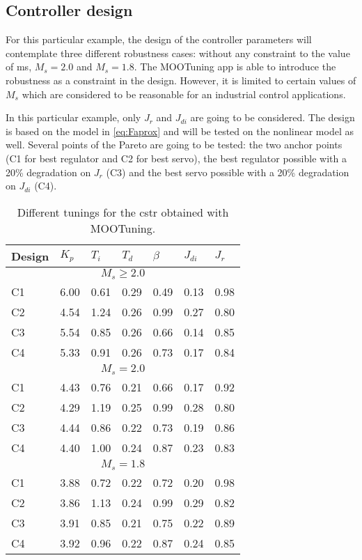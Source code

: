 \subsection{Controller design}
For this particular example, the design of the controller parameters will contemplate three different robustness cases: without any constraint to the value of \gls{ms}, $M_s = 2.0$ and $M_s = 1.8$. The MOOTuning app is able to introduce the robustness as a constraint in the design. However, it is limited to certain values of $M_s$ which are considered to be reasonable for an industrial control applications.

In this particular example, only $J_{r}$ and $J_{di}$ are going to be considered. The design is based on the model in \eqref{eq:Faprox} and will be tested on the nonlinear model as well. Several points of the Pareto are going to be tested: the two anchor points (C1 for best regulator and C2 for best servo), the best regulator possible with a 20\% degradation on $J_r$ (C3) and the best servo possible with a 20\% degradation on $J_{di}$ (C4).
%
\begin{table}[tb]
	\caption{Different tunings for the \gls{cstr} obtained with MOOTuning.}
	\centering
	\begin{tabular}{m{1cm}m{1cm}m{1cm}m{1cm}m{1cm}m{1cm}m{1cm}}
		\toprule
		Design & $K_p$ & $T_i$ & $T_d$ & $\beta$ & $J_{di}$ & $J_r$ \\
		\midrule
		\multicolumn{7}{c}{$M_s \geq 2.0$} \\
		\midrule
		C1 & 6.00 & 0.61 & 0.29 & 0.49 & 0.13 & 0.98\\
		C2 & 4.54 & 1.24 & 0.26 & 0.99 & 0.27 & 0.80\\
		C3 & 5.54 & 0.85 & 0.26 & 0.66 & 0.14 & 0.85\\
		C4 & 5.33 & 0.91 & 0.26 & 0.73 & 0.17 & 0.84\\
		\midrule
		\multicolumn{7}{c}{$M_s = 2.0$} \\
		\midrule
		C1 & 4.43 & 0.76 & 0.21 & 0.66 & 0.17 & 0.92\\
		C2 & 4.29 & 1.19 & 0.25 & 0.99 & 0.28 & 0.80\\
		C3 & 4.44 & 0.86 & 0.22 & 0.73 & 0.19 & 0.86\\
		C4 & 4.40 & 1.00 & 0.24 & 0.87 & 0.23 & 0.83\\
		\midrule
		\multicolumn{7}{c}{$M_s = 1.8$} \\
		\midrule
		C1 & 3.88 & 0.72 & 0.22 & 0.72 & 0.20 & 0.98\\
		C2 & 3.86 & 1.13 & 0.24 & 0.99 & 0.29 & 0.82\\
		C3 & 3.91 & 0.85 & 0.21 & 0.75 & 0.22 & 0.89\\
		C4 & 3.92 & 0.96 & 0.22 & 0.87 & 0.24 & 0.85\\
		\bottomrule
	\end{tabular}
	\label{tab:CSTRDesigns}
\end{table}

